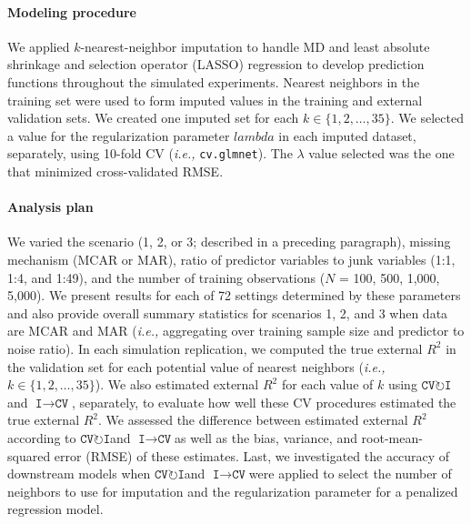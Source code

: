 \documentclass[AMA,STIX1COL,doublespace]{WileyNJD-v2}
\begin{document}
\paragraph{Modeling procedure}

We applied \(k\)-nearest-neighbor imputation to handle MD and least
absolute shrinkage and selection operator (LASSO) regression to develop
prediction functions throughout the simulated experiments. Nearest
neighbors in the training set were used to form imputed values in the
training and external validation sets. We created one imputed set for
each \(k \in \lbrace 1, 2, \ldots, 35\rbrace\). We selected a value for
the regularization parameter \(lambda\) in each imputed dataset,
separately, using 10-fold CV (\textit{i.e., }\texttt{cv.glmnet}). The
\(\lambda\) value selected was the one that minimized cross-validated
RMSE.

\paragraph{Analysis plan}

We varied the scenario (1, 2, or 3; described in a preceding paragraph),
missing mechanism (MCAR or MAR), ratio of predictor variables to junk
variables (1:1, 1:4, and 1:49), and the number of training observations
(\(N\) = 100, 500, 1,000, 5,000). We present results for each of 72
settings determined by these parameters and also provide overall summary
statistics for scenarios 1, 2, and 3 when data are MCAR and MAR
(\textit{i.e., }aggregating over training sample size and predictor to
noise ratio). In each simulation replication, we computed the true
external \(R^2\) in the validation set for each potential value of
nearest neighbors
(\textit{i.e., }\(k \in \lbrace 1, 2, \ldots, 35 \rbrace\)). We also
estimated external \(R^2\) for each value of \(k\) using
$\texttt{CV}\!\circlearrowright\!\texttt{I}$\space and
$\texttt{I}\!\!\rightarrow\!\texttt{CV}$, separately, to evaluate how
well these CV procedures estimated the true external \(R^2\). We
assessed the difference between estimated external \(R^2\) according to
$\texttt{CV}\!\circlearrowright\!\texttt{I}$\space and
$\texttt{I}\!\!\rightarrow\!\texttt{CV}$\space as well as the bias,
variance, and root-mean-squared error (RMSE) of these estimates. Last,
we investigated the accuracy of downstream models when
$\texttt{CV}\!\circlearrowright\!\texttt{I}$\space and
$\texttt{I}\!\!\rightarrow\!\texttt{CV}$\space were applied to select
the number of neighbors to use for imputation and the regularization
parameter for a penalized regression model.
\end{document}
